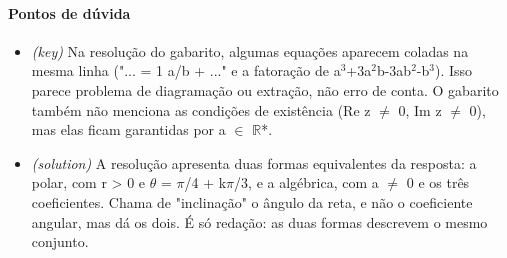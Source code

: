 \documentclass{article}%
\begin{document}
\paragraph{Pontos de dúvida}%
\begin{itemize}%
\item%
\textit{(key)} Na resolução do gabarito, algumas equações aparecem coladas na mesma linha ("... = 1 a/b + ..." e a fatoração de a$^3$+3a$^2$b-3ab$^2$-b$^3$). Isso parece problema de diagramação ou extração, não erro de conta. O gabarito também não menciona as condições de existência (Re z $\neq$ 0, Im z $\neq$ 0), mas elas ficam garantidas por a $\in$ $\mathbb{R}$*.%
\item%
\textit{(solution)} A resolução apresenta duas formas equivalentes da resposta: a polar, com r > 0 e $\theta$ = $\pi$/4 + k$\pi$/3, e a algébrica, com a $\neq$ 0 e os três coeficientes. Chama de "inclinação" o ângulo da reta, e não o coeficiente angular, mas dá os dois. É só redação: as duas formas descrevem o mesmo conjunto.%
\end{itemize}%
\end{document}
